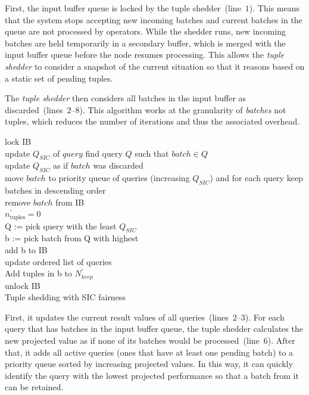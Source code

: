 First, the input buffer queue is locked by the tuple shedder~(line~$1$). This means that the system stops
accepting new incoming batches and current batches in the queue are not processed by operators. While the
shedder runs, new incoming batches are held temporarily in a secondary buffer, which is merged with the
input buffer queue before the node resumes processing. This allows the \emph{tuple shedder} to consider a
snapshot of the current situation so that it reasons based on a static set of pending tuples.

The \emph{tuple shedder} then considers all batches in the input buffer as discarded~(lines~$2$--$8$). 
This algorithm works at the granularity of \emph{batches} not tuples, which reduces the number of
iterations and thus the associated overhead.

\begin{algorithm}[b!] 

        lock IB\\
	{
		update $Q_{SIC}$ of $query$
	}
        {
		find query $Q$ such that $batch \in Q$ \\
		update ${Q}_{SIC}$ as if $batch$ was discarded \\
  		move $batch$ to priority queue of queries (increasing ${Q}_{SIC}$) and for each query keep batches in
  		descending \sic order\\
		remove $batch$ from IB\\
        }
	$n_{\mathrm{tuples}}^{\prime} = 0$\\
         {
                Q := pick query with the least ${Q}_{SIC}$ \\
                b := pick batch from Q with highest \sic \\
        	add b to IB\\
		update ordered list of queries\\
		Add tuples in b to $N_{keep}^{\prime}$ \\
        }
        unlock IB\\
\caption{Tuple shedding with SIC fairness}
\label{alg:distributedFairness}
\end{algorithm}

First, it updates the current result \sic values of all queries~(lines~$2$--$3$). 
For each query that has batches in the input buffer queue, the tuple shedder calculates the new projected
\sic value as if none of its batches would be processed~(line~$6$).
After that, it adds all active queries (\ie ones that have at least one pending batch) to a priority
queue sorted by increasing projected \sic values. In this way, it can quickly identify the query with
the lowest projected performance so that a batch from it can be retained.

